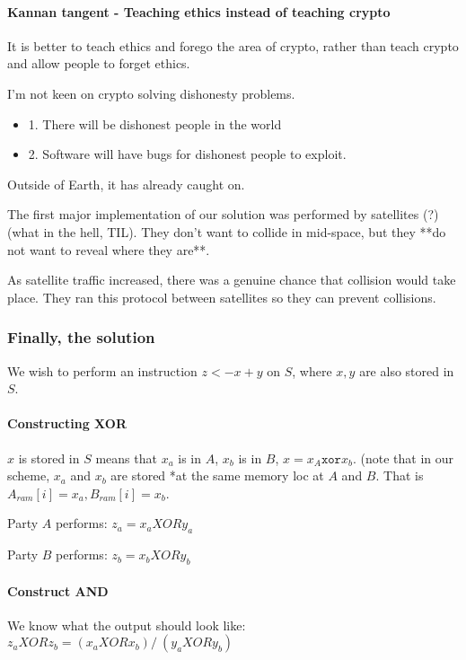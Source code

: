 \paragraph{Kannan tangent - Teaching ethics instead of teaching crypto}
It is better to teach ethics and forego the area of crypto, rather than teach crypto and allow people
to forget ethics.

I'm not keen on crypto solving dishonesty problems.

\begin{itemize}
\item 1. There will be dishonest people in the world
\item 2. Software will have bugs for dishonest people to exploit.
\end{itemize}

Outside of Earth, it has already caught on.

The first major implementation of our solution was performed by satellites (?) (what in the hell, TIL).
They don't want to collide in mid-space, but they **do not want to reveal where they are**.

As satellite traffic increased, there was a genuine chance that collision would take place.
They ran this protocol between satellites so they can prevent collisions.


\subsubsection{Finally, the solution}

We wish to perform an instruction $z <- x + y$ on $S$, where $x, y$ are also stored in $S$.

\paragraph{Constructing XOR}
$x$ is stored in $S$ means that $x_a$ is in $A$, $x_b$ is in $B$, $x = x_A \texttt{xor} x_b$.
(note that in our scheme, $x_a$ and $x_b$ are stored *at the same memory loc at $A$ and $B$.
That is $A_{ram}[i] = x_a, B_{ram}[i] = x_b$.


Party $A$ performs:
$z_a= x_a XOR y_a$

Party $B$ performs:
$z_b = x_b XOR y_b$



\paragraph{Construct AND}
We know what the output should look like:
$z_a XOR z_b = (x_a XOR x_b) /\ (y_a XOR y_b)$


